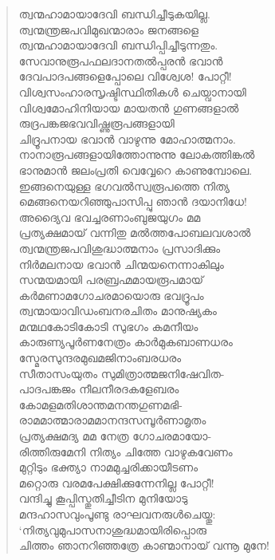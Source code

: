 \begin{verse}
ത്വന്മഹാമായാദേവി ബന്ധിച്ചീടുകയില്ല.\\
ത്വന്മന്ത്രജപവിമുഖന്മാരാം ജനങ്ങളെ\\
ത്വന്മഹാമായാദേവി ബന്ധിപ്പിച്ചീടുന്നതും.\\
സേവാനുരൂപഫലദാനതല്‍പ്പരന്‍ ഭവാന്‍\\
ദേവപാദപങ്ങളെപ്പോലെ വിശ്വേശ! പോറ്റീ!\\
വിശ്വസംഹാരസൃഷ്ടിസ്ഥിതികള്‍ ചെയ്വാനായി\\
വിശ്വമോഹിനിയായ മായതന്‍ ഗുണങ്ങളാല്‍\\
രുദ്രപങ്കജഭവവിഷ്ണുരൂപങ്ങളായി\\
ചിദ്രൂപനായ ഭവാന്‍ വാഴുന്നു മോഹാത്മനാം.\\
നാനാരൂപങ്ങളായിത്തോന്നുന്നു ലോകത്തിങ്കല്‍\\
ഭാനുമാന്‍ ജലംപ്രതി വെവ്വേറെ കാണുമ്പോലെ.\\
ഇങ്ങനെയുള്ള ഭഗവല്‍സ്വരൂപത്തെ നിത്യ\\
മെങ്ങനെയറിഞ്ഞുപാസിപ്പു ഞാന്‍ ദയാനിധേ!\\
അദ്യൈവ ഭവച്ചരണാംബുജയുഗം മമ\\
പ്രത്യക്ഷമായ് വന്നിതു മല്‍ത്തപോബലവശാല്‍\\
ത്വന്മന്ത്രജപവിശുദ്ധാത്മനാം പ്രസാദിക്കും\\
നിര്‍മലനായ ഭവാന്‍ ചിന്മയനെന്നാകിലും\\
സന്മയമായി പരബ്രഹ്മമായരൂപമായ്\\
കര്‍മണാമഗോചരമായൊരു ഭവദ്രൂപം\\
ത്വന്മായാവിഡംബനരചിതം മാനുഷ്യകം\\
മന്മഥകോടികോടി സുഭഗം കമനീയം\\
കാരുണ്യപൂര്‍ണനേത്രം കാര്‍മുകബാണധരം\\
സ്മേരസുന്ദരമുഖമജിനാംബരധരം\\
സീതാസംയുതം സുമിത്രാത്മജനിഷേവിത-\\
പാദപങ്കജം നീലനീരദകളേബരം\\
കോമളമതിശാന്തമനന്തഗുണമഭി-\\
രാമമാത്മാരാമമാനന്ദസമ്പൂര്‍ണാമൃതം\\
പ്രത്യക്ഷമദ്യ മമ നേത്ര ഗോചരമായോ-\\
രിത്തിരുമേനി നിത്യം ചിത്തേ വാഴുകവേണം\\
മുറ്റിടും ഭക്ത്യാ നാമമുച്ചരിക്കായീടണം\\
മറ്റൊരു വരമപേക്ഷിക്കുന്നേനില്ല പോറ്റീ!\\
വന്ദിച്ചു കൂപ്പിസ്തുതിച്ചീടിന മുനിയോടു\\
മന്ദഹാസവുംപൂണ്ടു രാഘവനരുള്‍ചെയ്തു:\\
‘നിത്യവുമുപാസനാശുദ്ധമായിരിപ്പൊരു\\
ചിത്തം ഞാനറിഞ്ഞത്രേ കാണ്മാനായ് വന്നൂ മുനേ!\\

\end{verse}
